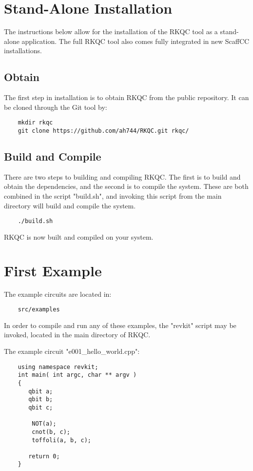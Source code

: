 \section{Stand-Alone Installation}
The instructions below allow for the installation of the RKQC tool as a stand-alone application. The full RKQC tool also comes fully integrated in new ScaffCC installations.

\subsection{Obtain}

The first step in installation is to obtain RKQC from the public repository. It can be cloned through the Git tool by:
\begin{lstlisting}
    mkdir rkqc 
    git clone https://github.com/ah744/RKQC.git rkqc/
\end{lstlisting}

\subsection{Build and Compile}

There are two steps to building and compiling RKQC. The first is to build and obtain the dependencies, and the second is to compile the system. These are both combined in the script "build.sh", and invoking this script from the main directory will build and compile the system. 

\begin{lstlisting}
    ./build.sh
\end{lstlisting}

RKQC is now built and compiled on your system.


\section{First Example}

The example circuits are located in: 
\begin{lstlisting} 
    src/examples 
\end{lstlisting}

In order to compile and run any of these examples, the "revkit" script may be invoked, located in the main directory of RKQC. 

The example circuit "e001\_hello\_world.cpp": 

\begin{lstlisting}
	using namespace revkit;
	int main( int argc, char ** argv )
	{
	   qbit a;
	   qbit b;
	   qbit c;
	
		NOT(a);
		cnot(b, c);
		toffoli(a, b, c);
	
	   return 0;
	}

\end{lstlisting}

